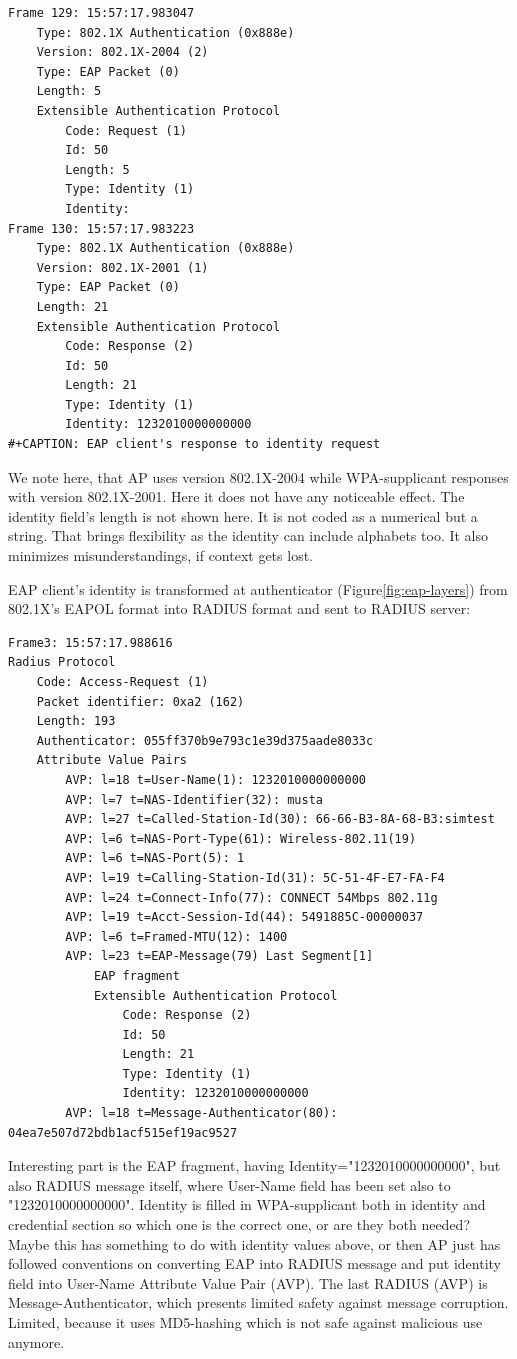 \documentclass[12pt,a4paper,english]{tutthesis}
\begin{document}
\begin{verbatim}
Frame 129: 15:57:17.983047
    Type: 802.1X Authentication (0x888e)
    Version: 802.1X-2004 (2)
    Type: EAP Packet (0)
    Length: 5
    Extensible Authentication Protocol
        Code: Request (1)
        Id: 50
        Length: 5
        Type: Identity (1)
        Identity: 
Frame 130: 15:57:17.983223
    Type: 802.1X Authentication (0x888e)
    Version: 802.1X-2001 (1)
    Type: EAP Packet (0)
    Length: 21
    Extensible Authentication Protocol
        Code: Response (2)
        Id: 50
        Length: 21
        Type: Identity (1)
        Identity: 1232010000000000
#+CAPTION: EAP client's response to identity request
\end{verbatim}
We note here, that AP uses version 802.1X-2004 while WPA-supplicant responses with
version 802.1X-2001. Here it does not have any noticeable effect.
The identity field's length is not shown here.
It is not coded as a numerical but a string.
That brings flexibility as the identity can include alphabets too. It also minimizes misunderstandings,
if context gets lost.





EAP client's identity is transformed at authenticator (Figure\ref{fig:eap-layers}) from 802.1X's 
EAPOL format  into RADIUS format and
sent to RADIUS server:
\begin{verbatim}
Frame3: 15:57:17.988616
Radius Protocol
    Code: Access-Request (1)
    Packet identifier: 0xa2 (162)
    Length: 193
    Authenticator: 055ff370b9e793c1e39d375aade8033c
    Attribute Value Pairs
        AVP: l=18 t=User-Name(1): 1232010000000000
        AVP: l=7 t=NAS-Identifier(32): musta
        AVP: l=27 t=Called-Station-Id(30): 66-66-B3-8A-68-B3:simtest
        AVP: l=6 t=NAS-Port-Type(61): Wireless-802.11(19)
        AVP: l=6 t=NAS-Port(5): 1
        AVP: l=19 t=Calling-Station-Id(31): 5C-51-4F-E7-FA-F4
        AVP: l=24 t=Connect-Info(77): CONNECT 54Mbps 802.11g
        AVP: l=19 t=Acct-Session-Id(44): 5491885C-00000037
        AVP: l=6 t=Framed-MTU(12): 1400
        AVP: l=23 t=EAP-Message(79) Last Segment[1]
            EAP fragment
            Extensible Authentication Protocol
                Code: Response (2)
                Id: 50
                Length: 21
                Type: Identity (1)
                Identity: 1232010000000000
        AVP: l=18 t=Message-Authenticator(80): 04ea7e507d72bdb1acf515ef19ac9527
\end{verbatim}
Interesting part is the EAP fragment, having
Identity="1232010000000000", but
also RADIUS message itself, where User-Name field has been set also 
to "1232010000000000". 
Identity is filled in WPA-supplicant both in identity and credential
section so which one is the correct one, or are they both needed?
Maybe this has something to do with identity
values above, or then AP just has followed conventions on converting
EAP into RADIUS message and put identity field into User-Name Attribute Value Pair (AVP).
The last RADIUS (AVP) is 
Message-Authenticator, which presents limited safety against message 
corruption. Limited, because it uses MD5-hashing which is not safe
against malicious use anymore.
\end{document}

